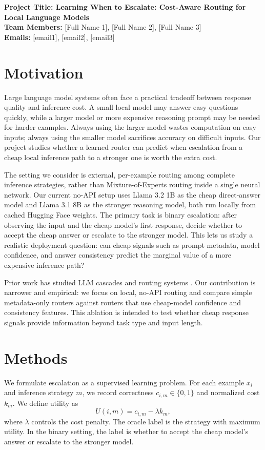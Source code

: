 \documentclass{article}
\renewcommand{\maketitle}{
  \begin{center}
    {\bf \large Project Title: Learning When to Escalate: Cost-Aware Routing for Local Language Models}\\
    \vspace{0.1cm}
    {\bf Team Members:} [Full Name 1], [Full Name 2], [Full Name 3]\\
    \vspace{0.1cm}
    {\bf Emails:} [email1], [email2], [email3]\\
    \vspace{0.2cm}
  \end{center}
}
\begin{document}
\maketitle

\section{Motivation}

Large language model systems often face a practical tradeoff between response quality and inference cost. A small local model may answer easy questions quickly, while a larger model or more expensive reasoning prompt may be needed for harder examples. Always using the larger model wastes computation on easy inputs; always using the smaller model sacrifices accuracy on difficult inputs. Our project studies whether a learned router can predict when escalation from a cheap local inference path to a stronger one is worth the extra cost.

The setting we consider is external, per-example routing among complete inference strategies, rather than Mixture-of-Experts routing inside a single neural network. Our current no-API setup uses Llama 3.2 1B as the cheap direct-answer model and Llama 3.1 8B as the stronger reasoning model, both run locally from cached Hugging Face weights. The primary task is binary escalation: after observing the input and the cheap model's first response, decide whether to accept the cheap answer or escalate to the stronger model. This lets us study a realistic deployment question: can cheap signals such as prompt metadata, model confidence, and answer consistency predict the marginal value of a more expensive inference path?

Prior work has studied LLM cascades and routing systems \cite{frugalgpt,routerbench,routellm}. Our contribution is narrower and empirical: we focus on local, no-API routing and compare simple metadata-only routers against routers that use cheap-model confidence and consistency features. This ablation is intended to test whether cheap response signals provide information beyond task type and input length.

\section{Methods}

We formulate escalation as a supervised learning problem. For each example $x_i$ and inference strategy $m$, we record correctness $c_{i,m} \in \{0,1\}$ and normalized cost $k_m$. We define utility as
\[
U(i,m) = c_{i,m} - \lambda k_m,
\]
where $\lambda$ controls the cost penalty. The oracle label is the strategy with maximum utility. In the binary setting, the label is whether to accept the cheap model's answer or escalate to the stronger model.
\end{document}

